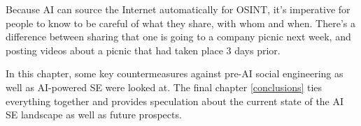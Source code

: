 
Because AI can source the Internet automatically for OSINT, it's imperative for people to know to be careful of what they share, with whom and when. There's a difference between sharing that one is going to a company picnic next week, and posting videos about a picnic that had taken place 3 days prior.



In this chapter, some key countermeasures against pre-AI social engineering as well as AI-powered SE were looked at. The final chapter \ref{conclusions} ties everything together and provides speculation about the current state of the AI SE landscape as well as future prospects.

